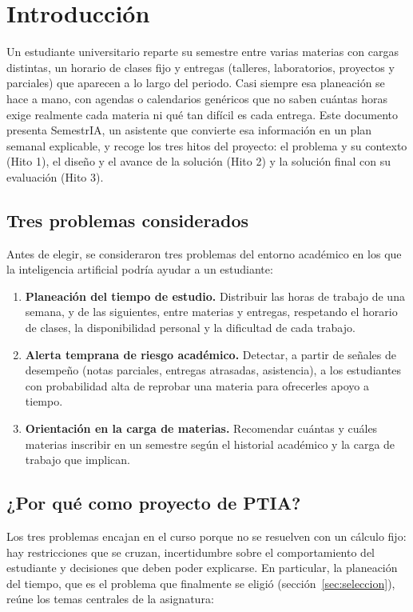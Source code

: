 \section{Introducción}

Un estudiante universitario reparte su semestre entre varias materias con cargas distintas, un horario de clases fijo y entregas (talleres, laboratorios, proyectos y parciales) que aparecen a lo largo del periodo. Casi siempre esa planeación se hace a mano, con agendas o calendarios genéricos que no saben cuántas horas exige realmente cada materia ni qué tan difícil es cada entrega. Este documento presenta SemestrIA, un asistente que convierte esa información en un plan semanal explicable, y recoge los tres hitos del proyecto: el problema y su contexto (Hito 1), el diseño y el avance de la solución (Hito 2) y la solución final con su evaluación (Hito 3).

\subsection{Tres problemas considerados}

Antes de elegir, se consideraron tres problemas del entorno académico en los que la inteligencia artificial podría ayudar a un estudiante:

\begin{enumerate}
    \item \textbf{Planeación del tiempo de estudio.} Distribuir las horas de trabajo de una semana, y de las siguientes, entre materias y entregas, respetando el horario de clases, la disponibilidad personal y la dificultad de cada trabajo.
    \item \textbf{Alerta temprana de riesgo académico.} Detectar, a partir de señales de desempeño (notas parciales, entregas atrasadas, asistencia), a los estudiantes con probabilidad alta de reprobar una materia para ofrecerles apoyo a tiempo.
    \item \textbf{Orientación en la carga de materias.} Recomendar cuántas y cuáles materias inscribir en un semestre según el historial académico y la carga de trabajo que implican.
\end{enumerate}

\subsection{¿Por qué como proyecto de PTIA?}

Los tres problemas encajan en el curso porque no se resuelven con un cálculo fijo: hay restricciones que se cruzan, incertidumbre sobre el comportamiento del estudiante y decisiones que deben poder explicarse. En particular, la planeación del tiempo, que es el problema que finalmente se eligió (sección~\ref{sec:seleccion}), reúne los temas centrales de la asignatura:

